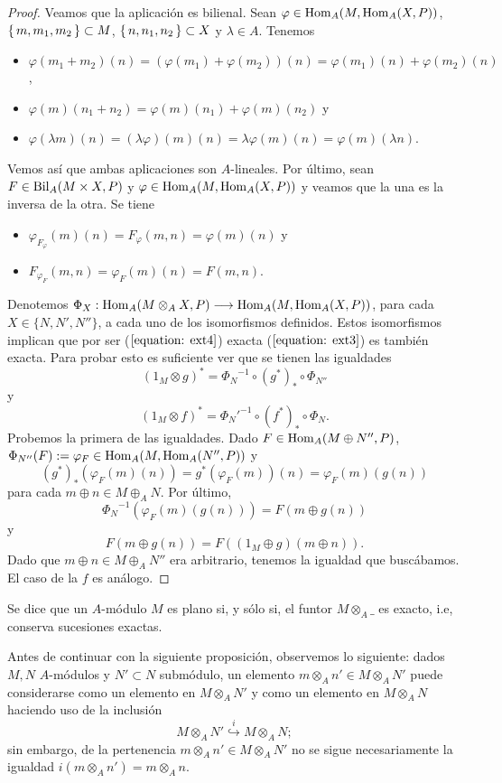\documentclass[../main.tex]{subfiles}
\begin{document}
\begin{proof}
	Veamos que la aplicación es bilienal. Sean $\varphi\in\operatorname{Hom}_A(M,\operatorname{Hom}_A(X,P))$, $\set{m,m_1,m_2}\subset M$, $\set{n,n_1,n_2}\subset X$ y $\lambda\in A$. Tenemos
	\begin{itemize}
		\item $\varphi(m_1+m_2)(n)=(\varphi(m_1)+\varphi(m_2))(n)=\varphi(m_1)(n)+\varphi(m_2)(n)$,
		\item $\varphi(m)(n_1+n_2)=\varphi(m)(n_1)+\varphi(m)(n_2)$ y
		\item $\varphi(\lambda m)(n)=(\lambda\varphi)(m)(n)=\lambda \varphi(m)(n)=\varphi(m)(\lambda n)$.
	\end{itemize}
	Vemos así que ambas aplicaciones son $A$-lineales. Por último, sean $F\in\operatorname{Bil}_A(M\times X,P)$ y $\varphi\in\operatorname{Hom}_A(M,\operatorname{Hom}_A(X,P))$ y veamos que la una es la inversa de la otra. Se tiene
	\begin{itemize}
		\item $\varphi_{F_\varphi}(m)(n)=F_\varphi(m,n)=\varphi(m)(n)$ y
		\item $F_{\varphi_F}(m,n)=\varphi_F(m)(n)=F(m,n).$
	\end{itemize}

	Denotemos $\Phi_X:\operatorname{Hom}_A(M\otimes_A X,P)\longrightarrow\operatorname{Hom}_A(M,\operatorname{Hom}_A(X,P))$, para cada $X\in\{N,N',N''\}$, a cada uno de los isomorfismos definidos.
	Estos isomorfismos implican que por ser ($\ref{equation: ext4}$) exacta ($\ref{equation: ext3}$) es también exacta. Para probar esto es suficiente ver que se tienen las igualdades
	$$(1_M\otimes g)^*={\Phi_N}^{-1}\circ(g^*)_*\circ\Phi_{N''}$$
	y
	$$(1_M\otimes f)^*={\Phi_N'}^{-1}\circ(f^*)_*\circ\Phi_{N}.$$
	Probemos la primera de las igualdades. Dado $F\in\operatorname{Hom}_A(M\oplus N'',P)$, $\Phi_{N''}(F):=\varphi_F\in\operatorname{Hom}_A(M,\operatorname{Hom}_A(N'',P))$ y $$(g^*)_*(\varphi_F(m)(n))=g^*(\varphi_F(m))(n)=\varphi_F(m)(g(n))$$
	para cada $m\oplus n\in M\oplus_A N$. Por último,
	$${\Phi_N}^{-1}(\varphi_F(m)(g(n)))=F(m\oplus g(n))$$
	y
	$$F(m\oplus g(n))=F((1_M\oplus g)(m\oplus n)).$$
	Dado que $m\oplus n\in M\oplus_A N''$ era arbitrario, tenemos la igualdad que buscábamos.
	El caso de la $f$ es análogo.
\end{proof}

\begin{definition}
	Se dice que un $A$-módulo $M$ es plano si, y sólo si, el funtor $M\otimes_A \_$ es exacto, i.e, conserva sucesiones exactas.
\end{definition}

Antes de continuar con la siguiente proposición, observemos lo siguiente: dados $M,N$ $A$-módulos y $N'\subset N$ submódulo, un elemento $m\otimes_A n'\in M\otimes_A N'$ puede considerarse como un elemento en $M\otimes_A N'$ y como un elemento en $M\otimes_A N$ haciendo uso de la inclusión $$M\otimes_A N'\overset{i}{\hookrightarrow}M\otimes_A N;$$
sin embargo, de la pertenencia $m\otimes_A n'\in M\otimes_A N'$ no se sigue necesariamente la igualdad $i(m\otimes_A n')=m\otimes_A n$.
\end{document}
